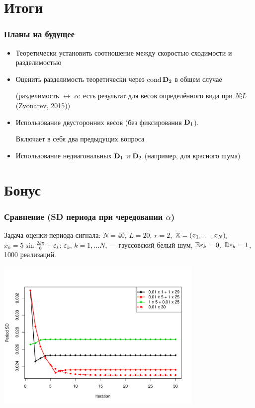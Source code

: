 \documentclass[unicode, notheorems]{beamer}
\DeclareMathOperator{\cond}{cond}
\begin{document}
\section{Итоги}

\begin{frame}
	\frametitle{Планы на будущее}
	\begin{itemize}
		\item Теоретически установить соотношение между скоростью сходимости и разделимостью
		\item Оценить разделимость теоретически через $\cond \bfD_2$ в общем случае
		
		(разделимость $\leftrightarrow$ $\alpha$: есть результат для весов определённого вида при $N \vdots L$ (Zvonarev, 2015))
		\item Использование двусторонних весов (без фиксирования $\mathbf{D}_1$).
		
		Включает в себя два предыдущих вопроса
		\item Использование недиагональных $\mathbf{D}_1$ и $\mathbf{D}_2$ (например, для красного шума)
	\end{itemize}
	
\end{frame}
\appendix
\section{Бонус}

\begin{frame}
	\frametitle{Сравнение (SD периода при чередовании $\alpha$)}
	Задача оценки периода сигнала: $N = 40$, $L = 20$, $r = 2$, $\mathbb{X} = (x_{1}, \ldots, x_N),$  $x_k = 5\sin{\frac{2 k \pi}{6}} + \varepsilon_k$; $\varepsilon_k$, $k = 1, \ldots N$, --- гауссовский белый шум, $\mathbb{E} \varepsilon_k = 0$, $\mathbb{D} \varepsilon_k = 1$, 1000 реализаций.
	
	\vspace{-1cm}
	\begin{center}
		\includegraphics*[width = 10cm]{esprit.pdf}
	\end{center}
\end{frame}


\end{document}

